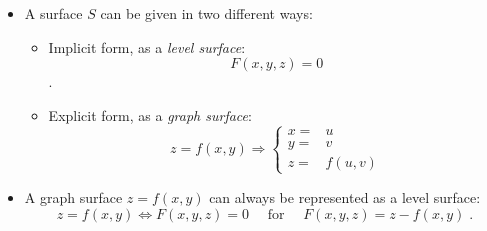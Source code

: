 \begin{frame}
\begin{itemize}
\item A surface $S$ can be given in two different ways:

\begin{itemize}
\item<2-> Implicit form, as a \emph{level surface}: $$F(x,y,z) = 0$$.
\item<3-> Explicit form, as a \emph{graph surface}:
\[z=f(x,y) \Longrightarrow 
\left\{ \begin{array}{ll}
x = & u \\
y = & v \\
z = & f(u,v)
\end{array} \right.
\]
\end{itemize}
\item<4-> A graph surface $z=f(x,y)$ can always be represented as a level surface:
\[
z=f(x,y) \Longleftrightarrow F(x,y,z) =0 \quad \text{ for } \quad F(x,y,z) = z-f(x,y)\; .
\]
\end{itemize}
\end{frame}
